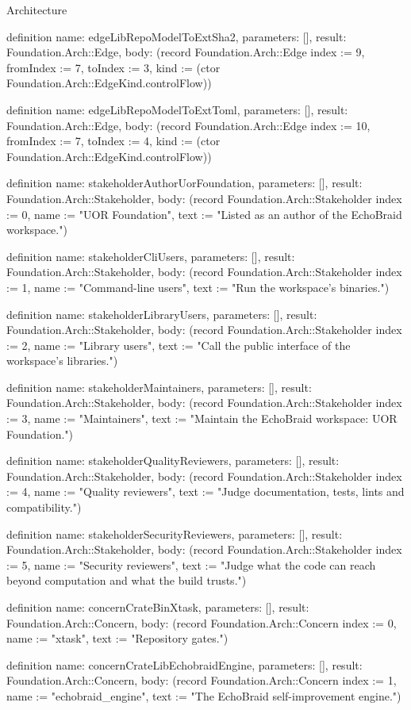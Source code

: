 \begin{lexlean}{Architecture}
\begin{semanticmodule}
definition{
  name: edgeLibRepoModelToExtSha2,
  parameters: [],
  result: Foundation.Arch::Edge,
  body: (record Foundation.Arch::Edge {index := 9, fromIndex := 7, toIndex := 3, kind := (ctor Foundation.Arch::EdgeKind.controlFlow)})
}

definition{
  name: edgeLibRepoModelToExtToml,
  parameters: [],
  result: Foundation.Arch::Edge,
  body: (record Foundation.Arch::Edge {index := 10, fromIndex := 7, toIndex := 4, kind := (ctor Foundation.Arch::EdgeKind.controlFlow)})
}

definition{
  name: stakeholderAuthorUorFoundation,
  parameters: [],
  result: Foundation.Arch::Stakeholder,
  body: (record Foundation.Arch::Stakeholder {index := 0, name := "UOR Foundation", text := "Listed as an author of the EchoBraid workspace."})
}

definition{
  name: stakeholderCliUsers,
  parameters: [],
  result: Foundation.Arch::Stakeholder,
  body: (record Foundation.Arch::Stakeholder {index := 1, name := "Command-line users", text := "Run the workspace's binaries."})
}

definition{
  name: stakeholderLibraryUsers,
  parameters: [],
  result: Foundation.Arch::Stakeholder,
  body: (record Foundation.Arch::Stakeholder {index := 2, name := "Library users", text := "Call the public interface of the workspace's libraries."})
}

definition{
  name: stakeholderMaintainers,
  parameters: [],
  result: Foundation.Arch::Stakeholder,
  body: (record Foundation.Arch::Stakeholder {index := 3, name := "Maintainers", text := "Maintain the EchoBraid workspace: UOR Foundation."})
}

definition{
  name: stakeholderQualityReviewers,
  parameters: [],
  result: Foundation.Arch::Stakeholder,
  body: (record Foundation.Arch::Stakeholder {index := 4, name := "Quality reviewers", text := "Judge documentation, tests, lints and compatibility."})
}

definition{
  name: stakeholderSecurityReviewers,
  parameters: [],
  result: Foundation.Arch::Stakeholder,
  body: (record Foundation.Arch::Stakeholder {index := 5, name := "Security reviewers", text := "Judge what the code can reach beyond computation and what the build trusts."})
}

definition{
  name: concernCrateBinXtask,
  parameters: [],
  result: Foundation.Arch::Concern,
  body: (record Foundation.Arch::Concern {index := 0, name := "xtask", text := "Repository gates."})
}

definition{
  name: concernCrateLibEchobraidEngine,
  parameters: [],
  result: Foundation.Arch::Concern,
  body: (record Foundation.Arch::Concern {index := 1, name := "echobraid_engine", text := "The EchoBraid self-improvement engine."})
}


\end{semanticmodule}
\end{lexlean}
